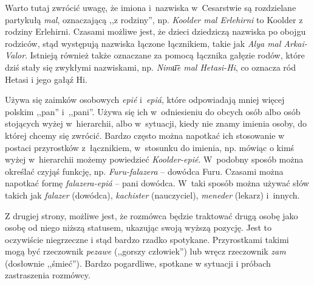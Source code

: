 Warto tutaj zwrócić uwagę, że imiona i~nazwiska w~Cesarstwie są rozdzielane
partykułą \emph{mal}, oznaczającą ,,z rodziny'', np. \emph{Koolder mal
    Erlehirni} to Koolder z rodziny Erlehirni. Czasami możliwe jest, że dzieci
dziedziczą nazwiska po obojgu rodziców, stąd występują nazwiska łączone
łącznikiem, takie jak \emph{Alya mal Arkai-Valor}. Istnieją również także
oznaczane za pomocą łącznika gałęzie rodów, które dziś stały się zwykłymi
nazwiskami, np. \emph{Nimu͞e mal Hetasi-Hi}, co oznacza ród Hetasi i jego gałąź
Hi.

\skipline

Używa się zaimków osobowych \emph{epié} i~\emph{epiá}, które odpowiadają mniej
więcej polskim ,,pan'' i~,,pani''. Używa się ich w~odniesieniu do obcych osób
albo osób stojących wyżej w~hierarchii, albo w~sytuacji, kiedy nie znamy imienia
osoby, do której chcemy się zwrócić. Bardzo często można napotkać ich stosowanie
w postaci przyrostków z~łącznikiem, w~stosunku do imienia, np. mówiąc o kimś
wyżej w~hierarchii możemy powiedzieć \emph{Koolder-epié}. W~podobny sposób
można określać czyjąś funkcję, np. \emph{Furu-falazera} -- dowódca Furu. Czasami
można napotkać formę \emph{falazera-epiá} -- pani dowódca. W~taki sposób można
używać słów takich jak \emph{falazer} (dowódca), \emph{kachister} (nauczyciel),
\emph{meneder} (lekarz) i~innych.


\skipline

Z drugiej strony, możliwe jest, że rozmówca będzie traktować drugą osobę jako
osobę od niego niższą statusem, ukazując swoją wyższą pozycję. Jest to
oczywiście niegrzeczne i stąd bardzo rzadko spotykane. Przyrostkami takimi mogą
być rzeczownik \emph{pezawe} (,,gorszy człowiek'') lub wręcz rzeczownik
\emph{zam} (dosłownie ,,śmieć''). Bardzo pogardliwe, spotkane w sytuacji i
próbach zastraszenia rozmówcy.

